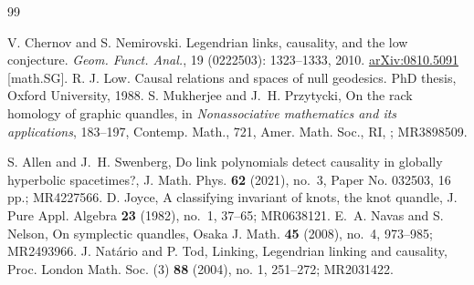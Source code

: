 \documentclass[12pt, letterpaper]{article}
\theoremstyle{plain}
\theoremstyle{definition}
\begin{document}
\begin{thebibliography}{99}

 V. Chernov and S. Nemirovski. Legendrian links, causality, and the low conjecture. {\it Geom. Funct. Anal.}, 19 (0222503): 1323–1333, 2010. \href{https://arxiv.org/abs/0810.5091}{arXiv:0810.5091} [math.SG].
  R. J. Low. Causal relations and spaces of null geodesics. PhD thesis, Oxford University, 1988. \label{L}
 S. Mukherjee and J.~H. Przytycki, On the rack homology of graphic quandles, in {\it Nonassociative mathematics and its applications}, 183--197, Contemp. Math., 721, Amer. Math. Soc., RI, ; MR3898509. \label{MP}

 S. Allen and J.~H. Swenberg, Do link polynomials detect causality in globally hyperbolic spacetimes?, J. Math. Phys. {\bf 62} (2021), no.~3, Paper No. 032503, 16 pp.; MR4227566. \label{AS}
D. Joyce, A classifying invariant of knots, the knot quandle, J. Pure Appl. Algebra {\bf 23} (1982), no.~1, 37--65; MR0638121. \label{J}
E.~A. Navas and S. Nelson, On symplectic quandles, Osaka J. Math. {\bf 45} (2008), no.~4, 973--985; MR2493966. \label{NN}
 J. Nat\'ario and P. Tod, Linking, Legendrian linking and causality, Proc. London Math. Soc. (3) \textbf{88} (2004), no. 1, 251--272; MR2031422.
       
     \end{thebibliography}   
            
              
     
   
  


    
   

        
\end{document}
